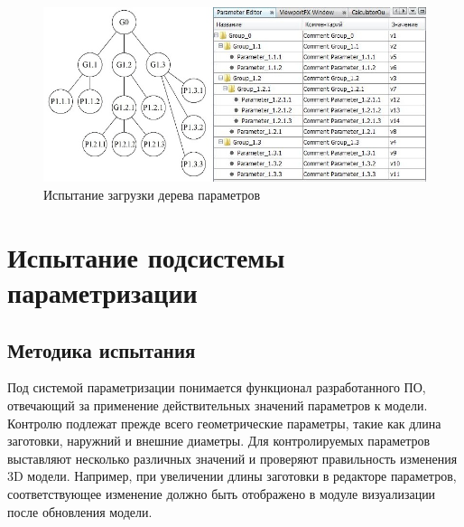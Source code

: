 \documentclass[14pt,oneside,final]{extreport}
\begin{document}
	\begin{figure}[!h]
		\begin{center}
			\includegraphics[width=\textwidth]{img/loader-tree-test} 
		\end{center}
		\caption{Испытание загрузки дерева параметров}
		\label{fig:loader-tree-test}
	\end{figure}
	
	\section{Испытание подсистемы параметризации}
	\subsection{Методика испытания}
	Под системой параметризации понимается функционал разработанного ПО, отвечающий за применение действительных значений параметров к модели. Контролю подлежат прежде всего геометрические параметры, такие как длина заготовки, наружний и внешние диаметры. Для контролируемых параметров выставляют несколько различных значений и проверяют правильность изменения 3D модели. Например, при увеличении длины заготовки в редакторе параметров, соответствующее изменение должно быть отображено в модуле визуализации после обновления модели. 
	
\end{document}
